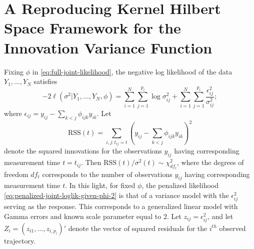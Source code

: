 
\section{A Reproducing Kernel Hilbert Space Framework for the Innovation Variance Function}

Fixing $\phi$ in \eqref{eq:full-joint-likelihood}, the negative log likelihood of the data $Y_1,\dots, Y_N$ satisfies
\begin{equation} \label{eq:penalized-joint-loglik-given-phi-2}
-2\ell\left(\sigma^2 \vert Y_1,\dots, Y_N ,\phi \right) =  \sum_{i = 1}^N \sum_{j = 1}^{p_i} \log \sigma^2_{ij}  + \sum_{i = 1}^N \sum_{j = 1}^{p_i} \frac {\epsilon_{ij}^2}{\sigma^2_{ij}};
\end{equation}
\noindent
where $\epsilon_{ij} =  y_{ij} - \sum_{k<j} \phi_{ijk} y_{ik}$. Let 
\begin{equation}
\mbox{RSS}\left( t \right) = \sum_{i,j:t_{ij}= t} \left( y_{ij} - \sum_{k<j} \phi_{ijk} y_{ik}\right)^2
\end{equation}
\noindent
denote the squared innovations for the observations $y_{ij}$ having corresponding measurement time $t = t_{ij}$. Then $\mbox{RSS}\left( t \right)/\sigma^2\left(t\right) \sim \chi^2_{df_t}$, where the degrees of freedom $df_{t}$ corresponds to the number of observations $y_{ij}$ having corresponding measurement time $t$. In this light, for fixed $\phi$, the penalized likelihood \eqref{eq:penalized-joint-loglik-given-phi-2} is that of a variance model with the $\epsilon_{ij}^2$ serving as the response.  This corresponds to a generalized linear model with Gamma errors and known scale parameter equal to 2. Let $z_{ij} = \epsilon_{ij}^2$, and let $Z_{i} = \left(z_{i1},\dots, z_{i,p_i} \right)'$ denote the vector of squared residuals for the $i^{th}$ observed trajectory. 

\bigskip


